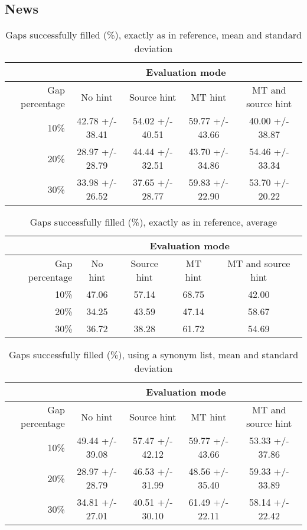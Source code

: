 \documentclass[11pt, oneside]{article}   	%
\begin{document}
\subsection{News}

\begin{table}[H]
\centering
\begin{tabular}{|r |*{4}{c}|}
\hline
 &\multicolumn{4}{c|}{Evaluation mode}\\
\hline
Gap percentage & No hint & Source hint & MT hint & MT and source hint\\
\hline
10\%&42.78 +/- 38.41&54.02 +/- 40.51&59.77 +/- 43.66&40.00 +/- 38.87\\
20\%&28.97 +/- 28.79&44.44 +/- 32.51&43.70 +/- 34.86&54.46 +/- 33.34\\
30\%&33.98 +/- 26.52&37.65 +/- 28.77&59.83 +/- 22.90&53.70 +/- 20.22\\
\hline
\end{tabular}
\caption {Gaps successfully filled (\%), exactly as in reference, mean and standard deviation} \label{tab:title} 
\end{table}

\begin{table}[H]
\centering
\begin{tabular}{|r |*{4}{c}|}
\hline
 &\multicolumn{4}{c|}{Evaluation mode}\\
\hline
Gap percentage & No hint & Source hint & MT hint & MT and source hint\\
\hline
10\%&47.06&57.14&68.75&42.00\\
20\%&34.25&43.59&47.14&58.67\\
30\%&36.72&38.28&61.72&54.69\\
\hline
\end{tabular}
\caption {Gaps successfully filled (\%), exactly as in reference, average} \label{tab:title} 
\end{table}

\begin{table}[H]
\centering
\begin{tabular}{|r |*{4}{c}|}
\hline
 &\multicolumn{4}{c|}{Evaluation mode}\\
\hline
Gap percentage & No hint & Source hint & MT hint & MT and source hint\\
\hline
10\%&49.44 +/- 39.08&57.47 +/- 42.12&59.77 +/- 43.66&53.33 +/- 37.86\\
20\%&28.97 +/- 28.79&46.53 +/- 31.99&48.56 +/- 35.40&59.33 +/- 33.89\\
30\%&34.81 +/- 27.01&40.51 +/- 30.10&61.49 +/- 22.11&58.14 +/- 22.42\\
\hline
\end{tabular}
\caption {Gaps successfully filled (\%), using a synonym list, mean and standard deviation} \label{tab:title} 
\end{table}
\end{document}
